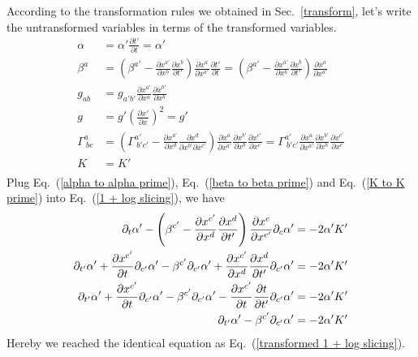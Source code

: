 \documentclass[letterpaper,nofootinbib,prd,amsmath,onecolumn]{revtex4-1}
\begin{document}
According to the transformation rules we obtained in Sec.~\ref{transform}, let's write the untransformed variables in terms of the transformed variables. 
\begin{align}
\alpha & = \alpha'\frac{\partial t'}{\partial t} = \alpha'\label{alpha to alpha prime}\\
\beta^{a} & = \left(\beta^{a'} - \frac{\partial x^{a'}}{\partial x^{b}}\frac{\partial x^{b}}{\partial t'}\right)\frac{\partial x^{a}}{\partial x^{a'}}\frac{\partial t'}{\partial t} =   \left(\beta^{a'} - \frac{\partial x^{a'}}{\partial x^{b}}\frac{\partial x^{b}}{\partial t'}\right)\frac{\partial x^{a}}{\partial x^{a'}}\label{beta to beta prime}\\
g_{ab} & = g_{a'b'}\frac{\partial x^{a'}}{\partial x^{a}}\frac{\partial x^{b'}}{\partial x^{b}}\label{metric to metric prime}\\
g & = g'\left(\frac{\partial x'}{\partial x}\right)^{2} = g'\label{det to det prime}\\
\Gamma^{a}_{~bc} & = \left(\Gamma^{a'}_{~b'c'} - \frac{\partial x^{a'}}{\partial x^{d}}\frac{\partial x^{d}}{\partial x^{b'}\partial x^{c'}}\right)\frac{\partial x^{a}}{\partial x^{a'}}\frac{\partial x^{b'}}{\partial x^{b}}\frac{\partial x^{c'}}{\partial x^{c}} = \Gamma^{a'}_{~b'c'}\frac{\partial x^{a}}{\partial x^{a'}}\frac{\partial x^{b'}}{\partial x^{b}}\frac{\partial x^{c'}}{\partial x^{c}}\label{gamma to gamma prime}\\
K & = K'\label{K to K prime}\\
\end{align}
Plug Eq.~(\ref{alpha to alpha prime}), Eq.~(\ref{beta to beta prime}) and Eq.~(\ref{K to K prime}) into Eq.~(\ref{1 + log slicing}), we have
\begin{align}
\partial_{t}\alpha' - \left(\beta^{c'} - \frac{\partial x^{c'}}{\partial x^{d}}\frac{\partial x^{d}}{\partial t'}\right)\frac{\partial x^{c}}{\partial x^{c'}}\partial_{c}\alpha' & = -2\alpha' K'\notag\\
\partial_{t'}\alpha' + \frac{\partial x^{c'}}{\partial t}\partial_{c'}\alpha' - \beta^{c'}\partial_{c'}\alpha' + \frac{\partial x^{c'}}{\partial x^{d}}\frac{\partial x^{d}}{\partial t'}\partial_{c'}\alpha' & = -2\alpha' K'\notag\\
\partial_{t'}\alpha' + \frac{\partial x^{c'}}{\partial t}\partial_{c'}\alpha' - \beta^{c'}\partial_{c'}\alpha' - \frac{\partial x^{c'}}{\partial t}\frac{\partial t}{\partial t'}\partial_{c'}\alpha' & = -2\alpha' K'\notag\\
\partial_{t'}\alpha'  - \beta^{c'}\partial_{c'}\alpha' & = -2\alpha' K'
\end{align}
Hereby we reached the identical equation as Eq.~(\ref{transformed 1 + log slicing}).
\end{document}
